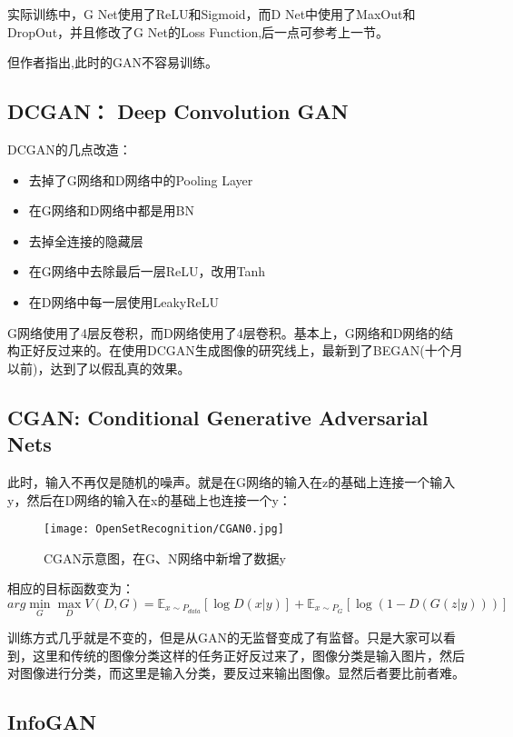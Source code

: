 实际训练中，G Net使用了ReLU和Sigmoid，而D Net中使用了MaxOut和DropOut，并且修改了G Net的Loss Function,后一点可参考上一节。

但作者指出,此时的GAN不容易训练。

\subsection{DCGAN： Deep Convolution GAN}

DCGAN的几点改造：
\begin{itemize}
\item 去掉了G网络和D网络中的Pooling Layer
\item 在G网络和D网络中都是用BN
\item 去掉全连接的隐藏层
\item 在G网络中去除最后一层ReLU，改用Tanh
\item 在D网络中每一层使用LeakyReLU
\end{itemize}

G网络使用了4层反卷积，而D网络使用了4层卷积。基本上，G网络和D网络的结构正好反过来的。在使用DCGAN生成图像的研究线上，最新到了BEGAN(十个月以前)，达到了以假乱真的效果。

\subsection{CGAN: Conditional Generative Adversarial Nets}

此时，输入不再仅是随机的噪声。就是在G网络的输入在z的基础上连接一个输入y，然后在D网络的输入在x的基础上也连接一个y：
\begin{figure}[!hbtp]
\centering
\texttt{[image: OpenSetRecognition/CGAN0.jpg]}
\caption{CGAN示意图，在G、N网络中新增了数据y}
\label{CGAN0}
\end{figure}

相应的目标函数变为：
\begin{displaymath}
arg \min_G \max_D V(D, G) = \mathbb{E}_{x \sim P_{data}}\left[ \log D(x | y) \right] + \mathbb{E}_{x \sim P_G} \left[ \log (1 - D(G(z | y))) \right]
\end{displaymath}

训练方式几乎就是不变的，但是从GAN的无监督变成了有监督。只是大家可以看到，这里和传统的图像分类这样的任务正好反过来了，图像分类是输入图片，然后对图像进行分类，而这里是输入分类，要反过来输出图像。显然后者要比前者难。


\subsection{InfoGAN}

